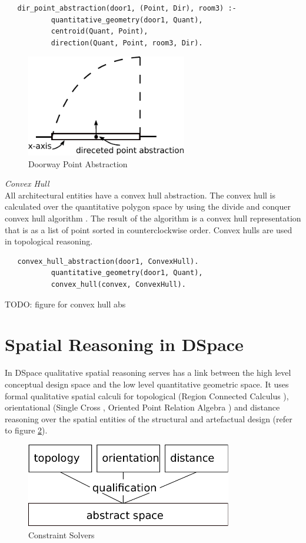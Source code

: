 \documentclass[12pt]{ucthesis}
\begin{document}
\begin{verbatim}
   dir_point_abstraction(door1, (Point, Dir), room3) :-
           quantitative_geometry(door1, Quant),
           centroid(Quant, Point),
           direction(Quant, Point, room3, Dir).
\end{verbatim}

\begin{figure}[H]\label{dir-point-abs}
\centering
\includegraphics[width=70mm]{dir-point-abs}
\caption{Doorway Point Abstraction}
\end{figure}

\noindent \emph{\large Convex Hull} \\
\indent All architectural entities have a convex hull abstraction. The convex hull is calculated over the quantitative polygon space by using the divide and conquer convex hull algorithm \cite{tbd}. The result of the algorithm is a convex hull representation that is as a list of point sorted in counterclockwise order. Convex hulls are used in topological reasoning.
\begin{verbatim}
   convex_hull_abstraction(door1, ConvexHull).
           quantitative_geometry(door1, Quant),
           convex_hull(convex, ConvexHull).
\end{verbatim}

TODO: figure for convex hull abs


\section{Spatial Reasoning in DSpace}
In DSpace qualitative spatial reasoning serves has a link between the high level conceptual design space and the low level quantitative geometric space. It uses formal qualitative spatial calculi for topological (Region Connected Calculus \cite{Freksa}), orientational (Single Cross \cite{Freksa}, Oriented Point Relation Algebra \cite{Moratz}) and distance reasoning over the spatial entities of the structural and artefactual design (refer to figure \ref{reasoner-design}). 

\begin{figure}[H]
\centering
\includegraphics[width=90mm]{reasoner-design}
\caption{Constraint Solvers}
\label{reasoner-design}
\end{figure}
\end{document}
